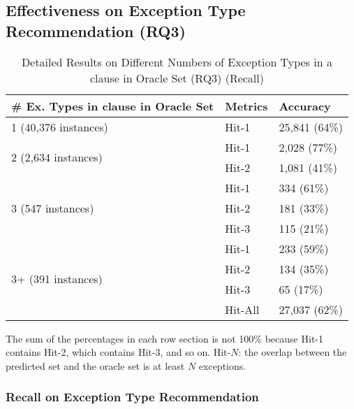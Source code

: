 \subsection{Effectiveness on Exception Type Recommendation (RQ3)}
\label{sec:rq3}

\begin{table}[t]
  \caption{Detailed Results on Different Numbers of Exception Types in a
     clause in Oracle Set (RQ3) (Recall)}
  \vspace{-12pt}
	{\small
		\begin{center}
			\renewcommand{\arraystretch}{1}
			\begin{tabular}{p{4.5cm}<{\centering}|p{1cm}<{\centering}|p{1.5cm}<{\centering}}
				\hline
				\# Ex. Types in \code{catch} clause in Oracle Set & Metrics &  Accuracy\\
				\hline
				\multirow{1}{*}{1 (40,376 instances)}   & Hit-1  & 25,841 (64\%) \\
				\hline
				\multirow{2}{*}{2 (2,634 instances)}  & Hit-1   & 2,028 (77\%) \\
				& Hit-2         &  1,081 (41\%) \\
				\hline
				\multirow{3}{*}{3 (547 instances)}  & Hit-1    & 334 (61\%) \\
				& Hit-2     & 181 (33\%)\\
				& Hit-3     & 115 (21\%) \\
				\hline
				\multirow{4}{*}{3+ (391 instances)}  & Hit-1   & 233 (59\%) \\
				& Hit-2     & 134 (35\%) \\
				& Hit-3     & 65 (17\%)\\
                                \hline
                                & Hit-All & 27,037 (62\%)\\
				\hline
			\end{tabular}
	                The sum of the percentages in each row section is not 100\% because Hit-1 contains Hit-2, which contains Hit-3, and so on. Hit-$N$: the overlap between the predicted set and the oracle set is at least $N$ exceptions.
			\label{tab:recall-3}
		\end{center}
	}
\end{table}

\subsubsection{{\bf Recall on Exception Type Recommendation}}
\label{sec:req3-recall}

